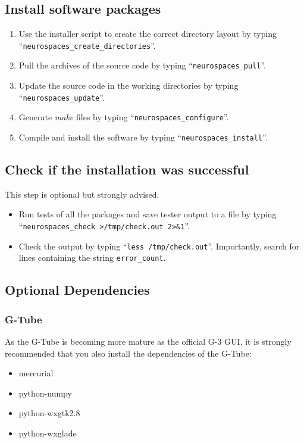 \documentclass[12pt]{article}
\begin{document}
\subsection*{Install software packages}

\begin{enumerate}
   \item Use the installer script to create the correct directory layout by typing ``{\tt neurospaces\_create\_directories}''.
   \item Pull the archives of the source code by typing ``{\tt neurospaces\_pull}''.
   \item Update the source code in the working directories by typing ``{\tt neurospaces\_update}''.
   \item Generate {\it make} files by typing ``{\tt neurospaces\_configure}''.
   \item Compile and install the software by typing ``{\tt neurospaces\_install}''.
\end{enumerate}

\subsection*{Check if the installation was successful}

This step is optional but strongly advised.

\begin{itemize}      
   \item[] Run tests of all the packages and save tester output to a file  by typing ``{\tt neurospaces\_check >/tmp/check.out 2>\&1}''.
   \item[] Check the output by typing ``{\tt less /tmp/check.out}''. Importantly, search for lines containing the string {\tt error\_count}.
\end{itemize}
    

\subsection*{Optional Dependencies}

\subsubsection*{G-Tube}

As the G-Tube is becoming more mature as the official G-3 GUI, it is
strongly recommended that you also install the dependencies of the G-Tube:

\begin{itemize}
\item mercurial
\item python-numpy
\item python-wxgtk2.8
\item python-wxglade
\end{itemize}
\end{document}
